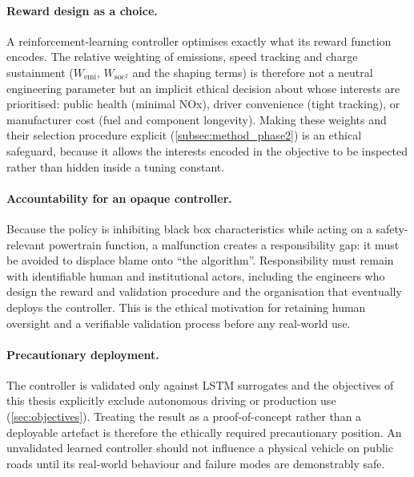 \paragraph{Reward design as a choice.} A reinforcement-learning controller optimises exactly what its reward function encodes. The relative weighting of emissions, speed tracking and charge sustainment ($W_{\text{emi}}$, $W_{\text{soc}^2}$ and the shaping terms) is therefore not a neutral engineering parameter but an implicit ethical decision about whose interests are prioritised: public health (minimal \ac{NOx}), driver convenience (tight tracking), or manufacturer cost (fuel and component longevity). Making these weights and their selection procedure explicit (\autoref{subsec:method_phase2}) is an ethical safeguard, because it allows the interests encoded in the objective to be inspected rather than hidden inside a tuning constant.

\paragraph{Accountability for an opaque controller.} Because the policy is inhibiting black box characteristics while acting on a safety-relevant powertrain function, a malfunction creates a responsibility gap: it must be avoided to displace blame onto ``the algorithm''. Responsibility must remain with identifiable human and institutional actors, including the engineers who design the reward and validation procedure and the organisation that eventually deploys the controller. This is the ethical motivation for retaining human oversight and a verifiable validation process before any real-world use.

\paragraph{Precautionary deployment.} The controller is validated only against \ac{LSTM} surrogates and the objectives of this thesis explicitly exclude autonomous driving or production use (\autoref{sec:objectives}). Treating the result as a proof-of-concept rather than a deployable artefact is therefore the ethically required precautionary position. An unvalidated learned controller should not influence a physical vehicle on public roads until its real-world behaviour and failure modes are demonstrably safe.

